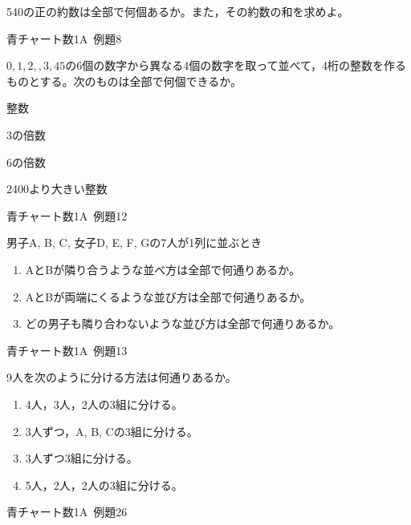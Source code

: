 \documentclass[b4paper, dvipdfmx, 11pt, fleqn, twocolumn, uplatex]{jsarticle}
\newenvironment{tabbedenum}[1]
{\NumTabs{#1}\begin{enumerate*}[label={(\arabic*)},itemjoin={\tab}]}{\end{enumerate*}}
\begin{document}

\begin{screen}
540の正の約数は全部で何個あるか。また，その約数の和を求めよ。
\begin{flushright}
    青チャート数1A~例題8
\end{flushright}
\end{screen}


\begin{screen}
$0,1, 2, ,3 ,4 5$の6個の数字から異なる4個の数字を取って並べて，4桁の整数を作るものとする。次のものは全部で何個できるか。\\
\begin{tabbedenum}{2}
	\item 整数
	\item 3の倍数
	\item 6の倍数
	\item 2400より大きい整数
\end{tabbedenum}
\begin{flushright}
    青チャート数1A~例題12
\end{flushright}
\end{screen}


\begin{screen}
男子A, B, C, 女子D, E, F, Gの7人が1列に並ぶとき
\begin{enumerate}[label={(\arabic*)}]
\item AとBが隣り合うような並べ方は全部で何通りあるか。
\item AとBが両端にくるような並び方は全部で何通りあるか。
\item どの男子も隣り合わないような並び方は全部で何通りあるか。
\end{enumerate}
\begin{flushright}
    青チャート数1A~例題13
\end{flushright}
\end{screen}


\begin{screen}
9人を次のように分ける方法は何通りあるか。
\begin{enumerate}[label={(\arabic*)}]
\item 4人，3人，2人の3組に分ける。
\item 3人ずつ，A, B, Cの3組に分ける。
\item 3人ずつ3組に分ける。
\item 5人，2人，2人の3組に分ける。
\end{enumerate}
\begin{flushright}
    青チャート数1A~例題26
\end{flushright}
\end{screen}
\end{document}
